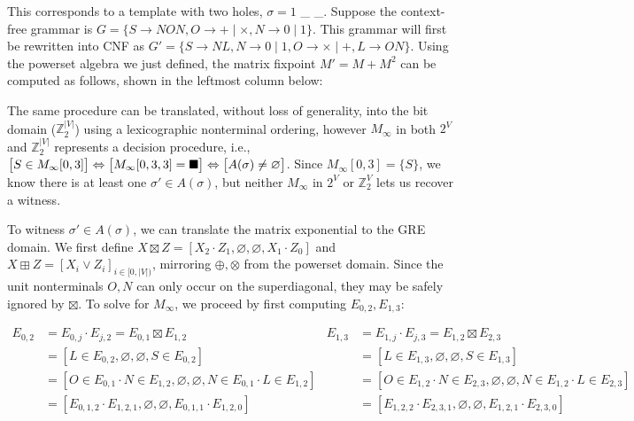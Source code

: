 \documentclass[sigplan,review,acmsmall,nonacm,screen,anonymous]{acmart}\settopmatter{printfolios=false,printccs=false,printacmref=false}
\begin{document}
\noindent This corresponds to a template with two holes, $\sigma = 1$ \_ \_. Suppose the context-free grammar is $G=\{S\rightarrow N O N, O \rightarrow + \mid \times, N \rightarrow 0 \mid 1\}$. This grammar will first be rewritten into CNF as $G'= \{S \rightarrow N L, N \rightarrow 0 \mid 1, O \rightarrow \times \mid +, L \rightarrow O N\}$. Using the powerset algebra we just defined, the matrix fixpoint $M' = M + M^2$ can be computed as follows, shown in the leftmost column below:\vspace{0.3cm}



\vspace{8pt}The same procedure can be translated, without loss of generality, into the bit domain ($\mathbb{Z}_2^{|V|}$) using a lexicographic nonterminal ordering, however $M_\infty$ in both $2^V$ and $\mathbb{Z}_2^{|V|}$ represents a decision procedure, i.e., $\big[S\in M_\infty[0, 3]\big]\Leftrightarrow \big[M_\infty[0, 3, 3]=\blacksquare\big] \Leftrightarrow \big[A(\sigma) \neq \varnothing\big]$. Since $M_\infty[0, 3] = \{S\}$, we know there is at least one $\sigma' \in A(\sigma)$, but neither $M_\infty$ in $2^V$ or $\mathbb{Z}_2^V$ lets us recover a witness.


To witness $\sigma' \in A(\sigma)$, we can translate the matrix exponential to the GRE domain. We first define $X \boxtimes Z = [X_2 \cdot Z_1, \varnothing, \varnothing, X_1 \cdot Z_0]$ and $X \boxplus Z = [X_i \lor Z_i]_{i \in [0, |V|)}$, mirroring $\oplus, \otimes$ from the powerset domain. Since the unit nonterminals $O, N$ can only occur on the superdiagonal, they may be safely ignored by $\boxtimes$. To solve for $M_\infty$, we proceed by first computing $E_{0, 2}, E_{1, 3}$:\vspace{-8pt}

\begin{small}
\begin{align*}
  E_{0, 2} &= E_{0, j} \cdot E_{j, 2} = E_{0, 1} \boxtimes E_{1, 2}                         &  E_{1, 3} &= E_{1, j} \cdot E_{j, 3} = E_{1, 2} \boxtimes E_{2, 3}\\
  &= [L \in E_{0, 2}, \varnothing, \varnothing, S \in E_{0, 2}]                                           &  &= [L \in E_{1, 3}, \varnothing, \varnothing, S \in E_{1, 3}]\\
  &= [O \in E_{0, 1} \cdot N \in E_{1, 2}, \varnothing, \varnothing, N \in E_{0, 1} \cdot L \in E_{1, 2}] &  &= [O \in E_{1, 2} \cdot N \in E_{2, 3}, \varnothing, \varnothing, N \in E_{1, 2} \cdot L \in E_{2, 3}]\\
  &= [E_{0, 1, 2} \cdot E_{1, 2, 1}, \varnothing, \varnothing, E_{0, 1, 1} \cdot E_{1, 2, 0}]             &  &= [E_{1, 2, 2} \cdot E_{2, 3, 1}, \varnothing, \varnothing, E_{1, 2, 1} \cdot E_{2, 3, 0}]
\end{align*}
\end{small}\vspace{-8pt}
\end{document}
